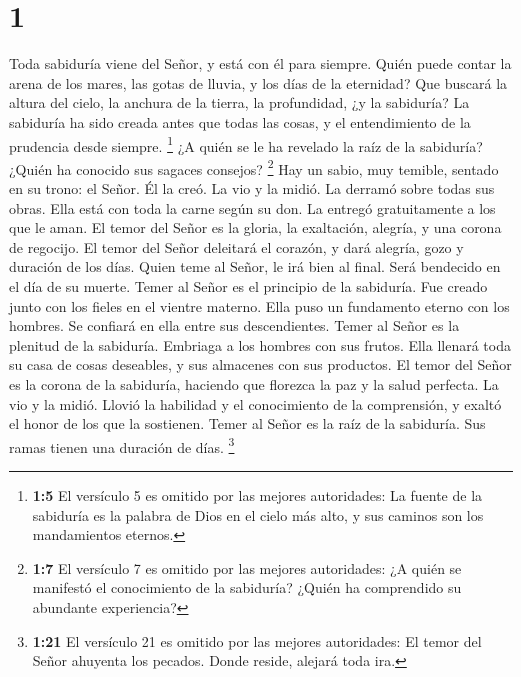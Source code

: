 \hypertarget{section}{%
\section{1}\label{section}}

 Toda sabiduría viene del Señor, y está con él para
siempre.  Quién puede contar la arena de los mares, las
gotas de lluvia, y los días de la eternidad?  Que buscará
la altura del cielo, la anchura de la tierra, la profundidad, ¿y la
sabiduría?  La sabiduría ha sido creada antes que todas
las cosas, y el entendimiento de la prudencia desde siempre.
 \footnote{\textbf{1:5} El versículo 5 es omitido por las
  mejores autoridades: La fuente de la sabiduría es la palabra de Dios
  en el cielo más alto, y sus caminos son los mandamientos eternos.}
 ¿A quién se le ha revelado la raíz de la sabiduría?
¿Quién ha conocido sus sagaces consejos?  \footnote{\textbf{1:7}
  El versículo 7 es omitido por las mejores autoridades: ¿A quién se
  manifestó el conocimiento de la sabiduría? ¿Quién ha comprendido su
  abundante experiencia?}  Hay un sabio, muy temible,
sentado en su trono: el Señor.  Él la creó. La vio y la
midió. La derramó sobre todas sus obras.  Ella está con
toda la carne según su don. La entregó gratuitamente a los que le aman.
 El temor del Señor es la gloria, la exaltación, alegría,
y una corona de regocijo.  El temor del Señor deleitará
el corazón, y dará alegría, gozo y duración de los días. 
Quien teme al Señor, le irá bien al final. Será bendecido en el día de
su muerte.  Temer al Señor es el principio de la
sabiduría. Fue creado junto con los fieles en el vientre materno.
 Ella puso un fundamento eterno con los hombres. Se
confiará en ella entre sus descendientes.  Temer al Señor
es la plenitud de la sabiduría. Embriaga a los hombres con sus frutos.
 Ella llenará toda su casa de cosas deseables, y sus
almacenes con sus productos.  El temor del Señor es la
corona de la sabiduría, haciendo que florezca la paz y la salud
perfecta.  La vio y la midió. Llovió la habilidad y el
conocimiento de la comprensión, y exaltó el honor de los que la
sostienen.  Temer al Señor es la raíz de la sabiduría.
Sus ramas tienen una duración de días.  \footnote{\textbf{1:21}
  El versículo 21 es omitido por las mejores autoridades: El temor del
  Señor ahuyenta los pecados. Donde reside, alejará toda ira.}
